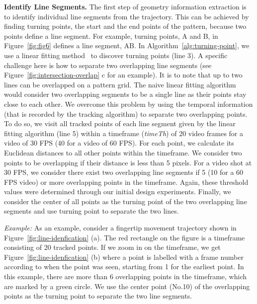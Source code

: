         \vspace{2mm}
        \noindent \textbf{Identify Line Segments.}
        The first step of geometry information extraction is to identify individual
        line segments from the trajectory. This can be achieved
        by finding turning points, the start and the end points of the pattern, because two points define a line segment. For example, turning points, A and B, in
        Figure~\ref{fig:fig6} defines a line segment, AB. In
        Algorithm~\ref{alg:turning-point}, we use a linear fitting
        method~\cite{Kutner2004Applied} to discover turning points (line 3). A specific
        challenge here is how to separate two overlapping line segments (see
        Figure~\ref{fig:intersection-overlap} c for an example).
        It is to note that up to two lines can be overlapped on a pattern grid.
        The naive
        linear fitting algorithm would consider two overlapping segments to be a
        single line as their points stay close to each other. We overcome this problem
       by using the temporal information (that is recorded by the
        tracking algorithm) to separate two overlapping points.
        To do so, we visit all tracked points of each line segment given by the linear fitting algorithm (line
        5) within a timeframe (\emph{timeTh}) of 20 video frames for a video of 30 FPS (40 for a video of 60 FPS).
        For each point, we calculate its Euclidean distances to all other points within the timeframe.
        We consider two points to be overlapping if their distance is less than 5 pixels.
        For a video shot at 30 FPS, we consider there exist two overlapping line segments if 5 (10 for a 60 FPS video) or more overlapping points in the timeframe.
        Again, these threshold values were determined through our initial design experiments.
        Finally, we consider the center of all points as the turning point of the two overlapping line segments and use turning point to separate the two lines.

        \noindent \emph{Example:} As an example, consider a fingertip movement trajectory shown in
        Figure~\ref{fig:line-idenfication} (a). The red rectangle on the
        figure is a timeframe consisting of 20 tracked points.  If we zoom in
        on the timeframe, we get Figure~\ref{fig:line-idenfication} (b) where
        a point is labelled with a frame number according to when
        the point was seen, starting from 1 for the earliest point. In this example, there are more than 6
        overlapping points in the timeframe, which are marked by a green
        circle. We use the center
        point (No.10) of the overlapping points as the turning point to separate the two line segments.

